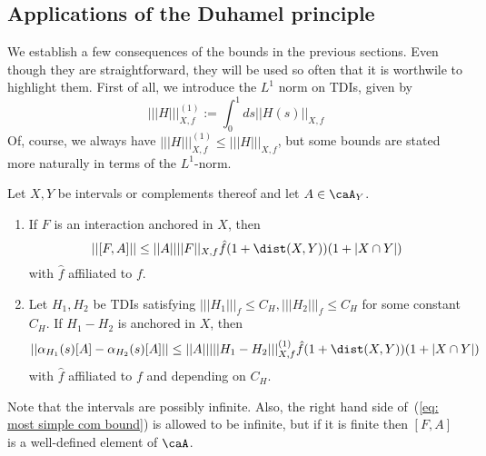 \subsection{Applications of the Duhamel principle}

We establish a few consequences of the bounds in the previous sections. Even though they are straightforward, they will be used so often that it is worthwile to highlight them. First of all, we introduce the $L^1$ norm on TDIs, given by 
$$
||| H |||^{(1)}_{X,f}:= \int_0^1 ds  || H(s) ||_{X,f}
$$
Of, course, we always have $||| H |||^{(1)}_{X,f}  \leq ||| H |||_{X,f}$, but some bounds are stated more naturally in terms of the $L^1$-norm. 
\begin{lemma} \label{lem: evolution by similar tdi}
	Let $X,Y$ be intervals or complements thereof and let $A\in\caA_Y$.
	\begin{enumerate}
		\item If $F$ is an interaction anchored in $X$, then
		\begin{equation}\label{eq: most simple com bound}
		||[F,A]|| \leq  ||A|| ||F||_{X,f} \hat{f}(1+\dist(X,Y)) (1+|X\cap Y|) 
		\end{equation}
		with $\hat{f}$ affiliated to $f$.
		\item
		Let $H_1,H_2$ be TDIs satisfying $|||H_1|||_f \leq C_H, |||H_2|||_f \leq C_H$ for some constant $C_H$. If $H_1-H_2$ is anchored in $X$, then 
		\begin{equation}\label{eq: duhamel practical}
		||\alpha_{H_1}(s)[A]-\alpha_{H_2}(s) [A] || \leq  ||A|| |||H_1-H_2|||^{(1)}_{X,f} \hat{f}(1+\dist(X,Y)) (1+|X\cap Y|)
		\end{equation}
		with $\hat{f}$ affiliated to $f$ and depending on $C_H$. 
	\end{enumerate}
\end{lemma}
\noindent Note that the intervals are possibly infinite. Also, the right hand side of~(\ref{eq: most simple com bound}) is allowed to be infinite, but if it is finite then $[F,A]$ is a well-defined element of $\caA$.
